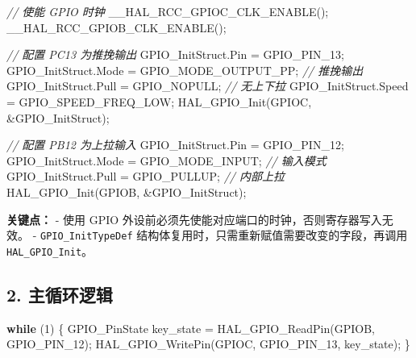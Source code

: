 \documentclass[
  chinese,
  UTF8,
  oneside,
  openany]{ctexbook}
\newenvironment{Shaded}{}{}
\newcommand{\CommentTok}[1]{\textcolor[rgb]{0.38,0.63,0.69}{\textit{#1}}}
\newcommand{\ControlFlowTok}[1]{\textcolor[rgb]{0.00,0.44,0.13}{\textbf{#1}}}
\newcommand{\DecValTok}[1]{\textcolor[rgb]{0.25,0.63,0.44}{#1}}
\newcommand{\NormalTok}[1]{#1}
\newcommand{\OperatorTok}[1]{\textcolor[rgb]{0.40,0.40,0.40}{#1}}
\begin{document}
\begin{Shaded}
\begin{Highlighting}[]
\CommentTok{// 使能 GPIO 时钟}
\NormalTok{\_\_HAL\_RCC\_GPIOC\_CLK\_ENABLE}\OperatorTok{();}
\NormalTok{\_\_HAL\_RCC\_GPIOB\_CLK\_ENABLE}\OperatorTok{();}

\CommentTok{// 配置 PC13 为推挽输出}
\NormalTok{GPIO\_InitStruct}\OperatorTok{.}\NormalTok{Pin   }\OperatorTok{=}\NormalTok{ GPIO\_PIN\_13}\OperatorTok{;}
\NormalTok{GPIO\_InitStruct}\OperatorTok{.}\NormalTok{Mode  }\OperatorTok{=}\NormalTok{ GPIO\_MODE\_OUTPUT\_PP}\OperatorTok{;}  \CommentTok{// 推挽输出}
\NormalTok{GPIO\_InitStruct}\OperatorTok{.}\NormalTok{Pull  }\OperatorTok{=}\NormalTok{ GPIO\_NOPULL}\OperatorTok{;}          \CommentTok{// 无上下拉}
\NormalTok{GPIO\_InitStruct}\OperatorTok{.}\NormalTok{Speed }\OperatorTok{=}\NormalTok{ GPIO\_SPEED\_FREQ\_LOW}\OperatorTok{;}
\NormalTok{HAL\_GPIO\_Init}\OperatorTok{(}\NormalTok{GPIOC}\OperatorTok{,} \OperatorTok{\&}\NormalTok{GPIO\_InitStruct}\OperatorTok{);}

\CommentTok{// 配置 PB12 为上拉输入}
\NormalTok{GPIO\_InitStruct}\OperatorTok{.}\NormalTok{Pin  }\OperatorTok{=}\NormalTok{ GPIO\_PIN\_12}\OperatorTok{;}
\NormalTok{GPIO\_InitStruct}\OperatorTok{.}\NormalTok{Mode }\OperatorTok{=}\NormalTok{ GPIO\_MODE\_INPUT}\OperatorTok{;}       \CommentTok{// 输入模式}
\NormalTok{GPIO\_InitStruct}\OperatorTok{.}\NormalTok{Pull }\OperatorTok{=}\NormalTok{ GPIO\_PULLUP}\OperatorTok{;}           \CommentTok{// 内部上拉}
\NormalTok{HAL\_GPIO\_Init}\OperatorTok{(}\NormalTok{GPIOB}\OperatorTok{,} \OperatorTok{\&}\NormalTok{GPIO\_InitStruct}\OperatorTok{);}
\end{Highlighting}
\end{Shaded}

\textbf{关键点：} - 使用 GPIO
外设前必须先使能对应端口的时钟，否则寄存器写入无效。 -
\texttt{GPIO\_InitTypeDef}
结构体复用时，只需重新赋值需要改变的字段，再调用
\texttt{HAL\_GPIO\_Init}。

\subsection{2. 主循环逻辑}\label{ux4e3bux5faaux73afux903bux8f91}

\begin{Shaded}
\begin{Highlighting}[]
\ControlFlowTok{while} \OperatorTok{(}\DecValTok{1}\OperatorTok{)}
\OperatorTok{\{}
\NormalTok{    GPIO\_PinState key\_state }\OperatorTok{=}\NormalTok{ HAL\_GPIO\_ReadPin}\OperatorTok{(}\NormalTok{GPIOB}\OperatorTok{,}\NormalTok{ GPIO\_PIN\_12}\OperatorTok{);}
\NormalTok{    HAL\_GPIO\_WritePin}\OperatorTok{(}\NormalTok{GPIOC}\OperatorTok{,}\NormalTok{ GPIO\_PIN\_13}\OperatorTok{,}\NormalTok{ key\_state}\OperatorTok{);}
\OperatorTok{\}}
\end{Highlighting}
\end{Shaded}
\end{document}
